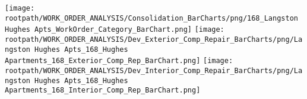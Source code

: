 \texttt{[image: \\rootpath/WORK\_ORDER\_ANALYSIS/Consolidation\_BarCharts/png/168\_Langston Hughes Apts\_WorkOrder\_Category\_BarChart.png]}
\texttt{[image: \\rootpath/WORK\_ORDER\_ANALYSIS/Dev\_Exterior\_Comp\_Repair\_BarCharts/png/Langston Hughes Apts\_168\_Hughes Apartments\_168\_Exterior\_Comp\_Rep\_BarChart.png]}
\texttt{[image: \\rootpath/WORK\_ORDER\_ANALYSIS/Dev\_Interior\_Comp\_Repair\_BarCharts/png/Langston Hughes Apts\_168\_Hughes Apartments\_168\_Interior\_Comp\_Rep\_BarChart.png]}
